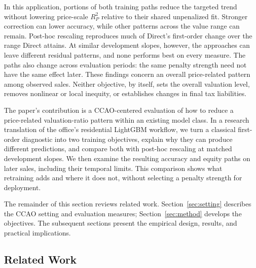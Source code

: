 \documentclass[10pt]{article}
\theoremstyle{definition}
\newcommand{\1}{\mathbf{1}}
\begin{document}
In this application, portions of both training paths reduce the targeted trend without lowering price-scale $R^2_P$ relative to their shared unpenalized fit. Stronger correction can lower accuracy, while other patterns across the value range can remain. Post-hoc rescaling reproduces much of Direct's first-order change over the range Direct attains. At similar development slopes, however, the approaches can leave different residual patterns, and none performs best on every measure. The paths also change across evaluation periods: the same penalty strength need not have the same effect later. These findings concern an overall price-related pattern among observed sales. Neither objective, by itself, sets the overall valuation level, removes nonlinear or local inequity, or establishes changes in final tax liabilities.

The paper's contribution is a CCAO-centered evaluation of how to reduce a price-related valuation-ratio pattern within an existing model class. In a research translation of the office's residential LightGBM workflow, we turn a classical first-order diagnostic into two training objectives, explain why they can produce different predictions, and compare both with post-hoc rescaling at matched development slopes. We then examine the resulting accuracy and equity paths on later sales, including their temporal limits. This comparison shows what retraining adds and where it does not, without selecting a penalty strength for deployment.

The remainder of this section reviews related work. Section~\ref{sec:setting} describes the CCAO setting and evaluation measures; Section~\ref{sec:method} develops the objectives. The subsequent sections present the empirical design, results, and practical implications.

\subsection{Related Work}
\label{subsec:related_work}
\end{document}
